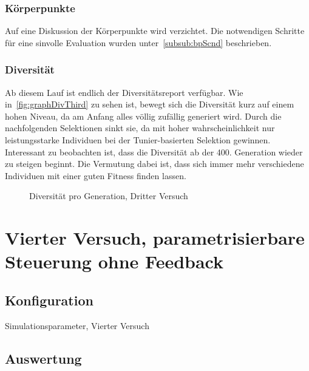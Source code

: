         \subsubsection{Körperpunkte}

          Auf eine Diskussion der Körperpunkte wird verzichtet.
          Die notwendigen Schritte für eine sinvolle Evaluation wurden unter~\vref{subsub:bpScnd} beschrieben.

        \subsubsection{Diversität}
          Ab diesem Lauf ist endlich der Diversitätsreport verfügbar. Wie in~\vref{fig:graphDivThird} zu sehen ist,
          bewegt sich die Diversität kurz auf einem hohen Niveau, da am Anfang alles völlig zufällig generiert wird.
          Durch die nachfolgenden Selektionen sinkt sie, da mit hoher wahrscheinlichkeit nur leistungsstarke Individuen
          bei der Tunier-basierten Selektion gewinnen. Interessant zu beobachten ist,
          dass die Diversität ab der 400. Generation wieder zu steigen beginnt.
          Die Vermutung dabei ist, dass sich immer mehr verschiedene Individuen mit einer
          guten Fitness finden lassen.

          \begin{figure}
            \centering
            
            \caption{Diversität pro Generation, Dritter Versuch\label{fig:graphDivThird}}
          \end{figure}

      \section{Vierter Versuch, parametrisierbare Steuerung ohne Feedback}

        \subsection{Konfiguration}

          \begin{table}[H]
            \centering
            
            \caption{Simulationsparameter, Vierter Versuch \label{tbl:forthRunConf}}
          \end{table}

        \subsection{Auswertung}

